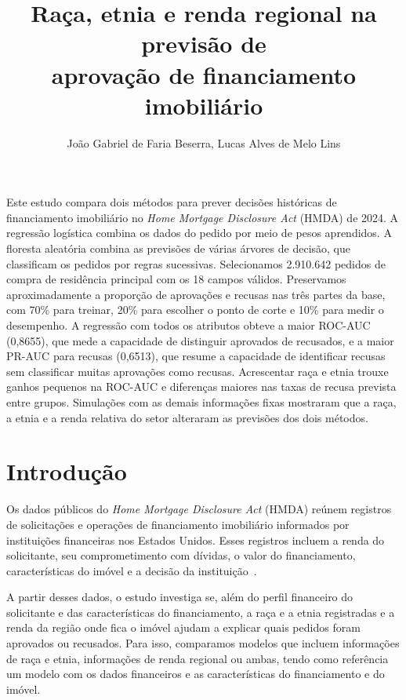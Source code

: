 \documentclass[12pt]{article}
\title{Raça, etnia e renda regional na previsão de\\
aprovação de financiamento imobiliário}
\author{João Gabriel de Faria Beserra\inst{1}, Lucas Alves de Melo Lins\inst{1}}
\begin{document}
\maketitle

\begin{resumo}
Este estudo compara dois métodos para prever decisões históricas de
financiamento imobiliário no \textit{Home Mortgage Disclosure Act}
(HMDA) de 2024. A regressão logística combina os dados do pedido por
meio de pesos aprendidos. A floresta aleatória combina as previsões de
várias árvores de decisão, que classificam os pedidos por regras
sucessivas.
Selecionamos 2.910.642 pedidos de compra de residência principal
com os 18 campos válidos. Preservamos aproximadamente a proporção de
aprovações e recusas nas três partes da base, com 70\% para treinar,
20\% para escolher o ponto de corte e 10\% para medir o desempenho.
A regressão com todos os atributos obteve a maior ROC-AUC (0,8655),
que mede a capacidade de distinguir aprovados de recusados, e a
maior PR-AUC para recusas (0,6513), que resume a capacidade de
identificar recusas sem classificar muitas aprovações como recusas.
Acrescentar raça e etnia trouxe
ganhos pequenos na ROC-AUC e diferenças maiores nas taxas de recusa
prevista entre grupos. Simulações com as demais informações fixas
mostraram que a raça, a etnia e a renda relativa do setor alteraram
as previsões dos dois métodos.
\end{resumo}

\section{Introdução}

Os dados públicos do \textit{Home Mortgage Disclosure Act} (HMDA) reúnem
registros de solicitações e operações de financiamento imobiliário
informados por instituições financeiras nos Estados Unidos. Esses
registros incluem a renda do solicitante, seu comprometimento com dívidas,
o valor do financiamento, características do imóvel e a decisão da
instituição~\cite{ffiec:lar}.

A partir desses dados, o estudo investiga se, além do perfil financeiro
do solicitante e das características do financiamento, a raça e a etnia
registradas e a renda da região onde fica o imóvel ajudam a explicar
quais pedidos foram aprovados ou recusados. Para isso, comparamos
modelos que incluem informações de raça e etnia, informações de renda
regional ou ambas, tendo como referência um modelo com os dados
financeiros e as características do financiamento e do imóvel.
\end{document}
